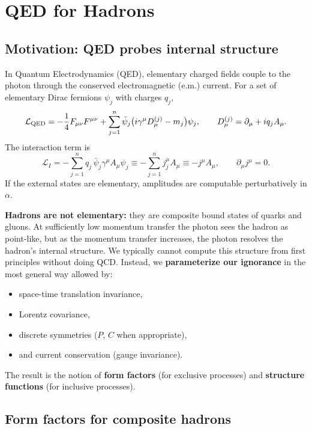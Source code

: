 \chapter{QED for Hadrons}
\label{ch:qed-for-hadrons}

\section{Motivation: QED probes internal structure}
In Quantum Electrodynamics (QED), elementary charged fields couple to the photon
through the conserved electromagnetic (e.m.) current. For a set of elementary
Dirac fermions $\psi_j$ with charges $q_j$,
\begin{equation}
\mathcal L_{\rm QED}
= -\frac14 F_{\mu\nu}F^{\mu\nu}
+ \sum_{j=1}^n \bar\psi_j \bigl(i\gamma^\mu D_\mu^{(j)} - m_j\bigr)\psi_j,
\qquad
D_\mu^{(j)}=\partial_\mu+i q_j A_\mu .
\end{equation}
The interaction term is
\begin{equation}
\mathcal L_I = -\sum_{j=1}^n q_j\,\bar\psi_j\gamma^\mu A_\mu \psi_j
\equiv -\sum_{j=1}^n j_j^\mu A_\mu \equiv - j^\mu A_\mu,
\qquad \partial_\mu j^\mu=0.
\end{equation}
If the external states are elementary, amplitudes are computable perturbatively in $\alpha$.

\medskip
\noindent\textbf{Hadrons are not elementary:} they are composite bound states of quarks and gluons.
At sufficiently low momentum transfer the photon sees the hadron as point-like,
but as the momentum transfer increases, the photon resolves the hadron's internal
structure. We typically cannot compute this structure from first principles
without doing QCD. Instead, we \textbf{parameterize our ignorance} in the most general way allowed by:
\begin{itemize}
  \item space-time translation invariance,
  \item Lorentz covariance,
  \item discrete symmetries ($P$, $C$ when appropriate),
  \item and current conservation (gauge invariance).
\end{itemize}
The result is the notion of \textbf{form factors} (for exclusive processes) and
\textbf{structure functions} (for inclusive processes).

\section{Form factors for composite hadrons}
